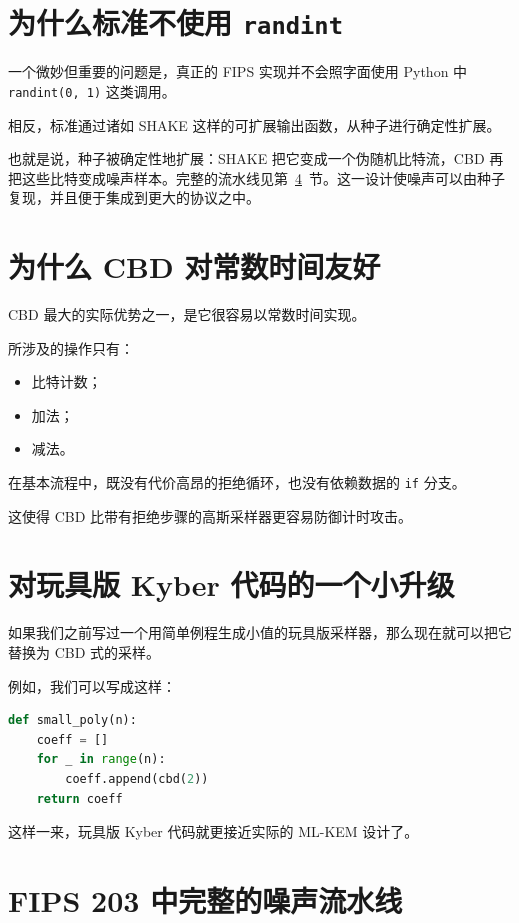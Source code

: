 \section{为什么标准不使用 \texttt{randint}}

一个微妙但重要的问题是，真正的 FIPS 实现并不会照字面使用 Python 中 \texttt{randint(0, 1)} 这类调用。

相反，标准通过诸如 SHAKE 这样的可扩展输出函数，从种子进行确定性扩展。

也就是说，种子被确定性地扩展：SHAKE 把它变成一个伪随机比特流，CBD 再把这些比特变成噪声样本。完整的流水线见第~\ref{sec:cbd-pipeline}~节。这一设计使噪声可以由种子复现，并且便于集成到更大的协议之中。

\section{为什么 CBD 对常数时间友好}

CBD 最大的实际优势之一，是它很容易以常数时间实现。

所涉及的操作只有：

\begin{itemize}
  \item 比特计数；
  \item 加法；
  \item 减法。
\end{itemize}

在基本流程中，既没有代价高昂的拒绝循环，也没有依赖数据的 \texttt{if} 分支。

这使得 CBD 比带有拒绝步骤的高斯采样器更容易防御计时攻击。

\section{对玩具版 Kyber 代码的一个小升级}

如果我们之前写过一个用简单例程生成小值的玩具版采样器，那么现在就可以把它替换为 CBD 式的采样。

例如，我们可以写成这样：

\begin{lstlisting}[language=Python]
def small_poly(n):
    coeff = []
    for _ in range(n):
        coeff.append(cbd(2))
    return coeff
\end{lstlisting}

这样一来，玩具版 Kyber 代码就更接近实际的 ML-KEM 设计了。

\section{FIPS 203 中完整的噪声流水线}
\label{sec:cbd-pipeline}

